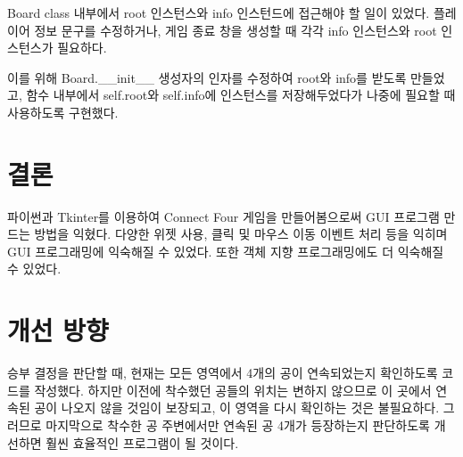 \documentclass{article}
\begin{document}
Board class 내부에서 root 인스턴스와 info 인스턴드에 접근해야 할 일이 있었다.
플레이어 정보 문구를 수정하거나, 게임 종료 창을 생성할 때 각각 info 인스턴스와 root 인스턴스가 필요하다.

이를 위해 Board.\_\_init\_\_ 생성자의 인자를 수정하여 root와 info를 받도록 만들었고,
함수 내부에서 self.root와 self.info에 인스턴스를 저장해두었다가 나중에 필요할 때 사용하도록 구현했다.

\section{결론}

파이썬과 Tkinter를 이용하여 Connect Four 게임을 만들어봄으로써 GUI 프로그램 만드는 방법을 익혔다.
다양한 위젯 사용, 클릭 및 마우스 이동 이벤트 처리 등을 익히며 GUI 프로그래밍에 익숙해질 수 있었다.
또한 객체 지향 프로그래밍에도 더 익숙해질 수 있었다.

\section{개선 방향}

승부 결정을 판단할 때, 현재는 모든 영역에서 4개의 공이 연속되었는지 확인하도록 코드를 작성했다.
하지만 이전에 착수했던 공들의 위치는 변하지 않으므로 이 곳에서 연속된 공이 나오지 않을 것임이 보장되고, 이 영역을 다시 확인하는 것은 불필요하다.
그러므로 마지막으로 착수한 공 주변에서만 연속된 공 4개가 등장하는지 판단하도록 개선하면 훨씬 효율적인 프로그램이 될 것이다.
\end{document}
